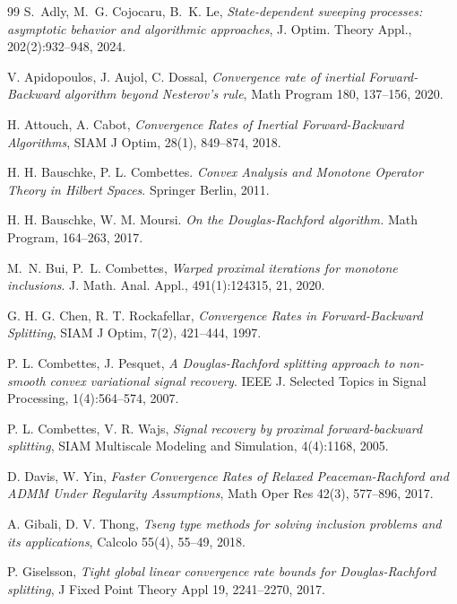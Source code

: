 \documentclass[11pt]{article}
\theoremstyle{definition}
\theoremstyle{definition}
\theoremstyle{definition}
\begin{document}
\begin{thebibliography}{99}
 {\sc S.~Adly, M.~G. Cojocaru, B.~K. Le},
\emph{State-dependent sweeping processes: asymptotic behavior and algorithmic approaches},
 { J. Optim. Theory Appl.}, 202(2):932--948, 2024.

   {\sc V. Apidopoulos, J. Aujol, C. Dossal}, \emph{Convergence rate of inertial Forward-Backward algorithm beyond Nesterov's rule}, Math Program 180, 137--156, 2020. 

   {\sc  H. Attouch, A. Cabot}, \emph{Convergence Rates of Inertial Forward-Backward Algorithms}, SIAM J Optim, 28(1), 849--874, 2018.

   { \sc H. H. Bauschke, P. L. Combettes}. \emph{Convex Analysis and Monotone Operator
Theory in Hilbert Spaces}. Springer Berlin, 2011.

   {\sc H. H. Bauschke, W. M. Moursi}.   \emph{On the Douglas-Rachford algorithm.}  Math Program, 164--263, 2017.

 {\sc M.~N. Bui, P.~L. Combettes},
 \emph{Warped proximal iterations for monotone inclusions}.
 { J. Math. Anal. Appl.}, 491(1):124315, 21, 2020.

   {\sc G. H. G. Chen, R. T. Rockafellar}, \emph{Convergence Rates in Forward-Backward Splitting}, SIAM J Optim, 7(2), 421--444, 1997.

 {\sc P. L. Combettes, J. Pesquet}, \emph{A Douglas-Rachford splitting approach to non-
smooth convex variational signal recovery}. IEEE J. Selected Topics in Signal Processing, 1(4):564--574, 2007.

 {\sc P. L. Combettes, V. R. Wajs}, \emph{Signal recovery by proximal forward-backward
splitting}, SIAM Multiscale Modeling and Simulation, 4(4):1168, 2005.




   {\sc D. Davis, W. Yin},  \emph{ Faster Convergence Rates of Relaxed Peaceman-Rachford and ADMM Under Regularity Assumptions}, Math Oper Res 42(3), 577--896, 2017.

   {\sc A. Gibali, D. V. Thong},  \emph{Tseng type methods for solving inclusion problems and its applications}, Calcolo 55(4), 55--49, 2018.

   {\sc P. Giselsson},  \emph{Tight global linear convergence rate bounds for Douglas-Rachford splitting},
J Fixed Point Theory Appl  19,  2241--2270, 2017. 



\end{thebibliography}
\end{document}
